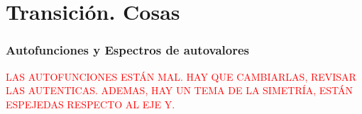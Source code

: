 \chapter{Transición. Cosas} \label{cap:transition_apendice}

\subsection{Autofunciones y Espectros de autovalores}

\textcolor{red}{LAS AUTOFUNCIONES ESTÁN MAL. HAY QUE CAMBIARLAS, REVISAR LAS AUTENTICAS. ADEMAS, HAY UN TEMA DE LA SIMETRÍA, ESTÁN ESPEJEDAS RESPECTO AL EJE Y.}

\begin{figure}[H]
  \centering
  \caption{}
  \label{fig:eigenfuns1-Re5000-Pr0071}
\end{figure}

\begin{figure}[H]
  \centering    
  \caption{}
  \label{fig:eigenfuns2-Re5000-Pr0071}
\end{figure}

\begin{figure}[H]
  \centering  
  \caption{}
  \label{fig:eigenfuns3-Re5000-Pr0071}
\end{figure}

